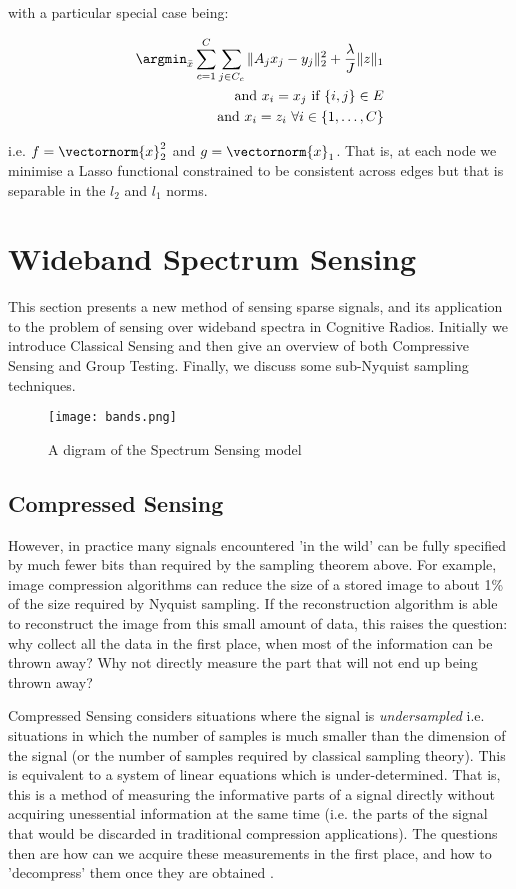 with a particular special case being:

\begin{align}
\argmin_{\bar{x}} \sum_{c=1}^C \sum_{j \in C_c} \|A_jx_j - y_j\|_2^2 + \frac{\lambda}{J}\|z\|_1 \nonumber \\ 
\text{ and } x_i = x_j \text{ if } \{i,j\} \in E \nonumber \\
\text{ and } x_i = z_i \text{ } \forall i \in \{1, \ldots, C\}
\label{constrainedbp}
\end{align}

i.e. \(f = \vectornorm{x}_2^2\) and \(g = \vectornorm{x}_1\). That is, at each node we minimise a Lasso functional constrained to be consistent across edges but that is separable in the \(l_2\) and \(l_1\) norms.

\section{Wideband Spectrum Sensing}
This section presents a new method of sensing sparse signals, and its application to the problem of sensing over wideband spectra in Cognitive Radios. Initially we introduce Classical Sensing and then give an overview of both Compressive Sensing and Group Testing. Finally, we discuss some sub-Nyquist sampling techniques.

\begin{figure*}[h]
\centering
\texttt{[image: bands.png]}
\caption{A digram of the Spectrum Sensing model \cite{Tian}}
\label{widebandspectra}
\end{figure*}



\subsection{Compressed Sensing}

However, in practice many signals encountered 'in the wild' can be fully specified by much fewer bits than required by the sampling theorem above. For example, image compression algorithms can reduce the size of a stored image to about 1\% of the size required by Nyquist sampling. If the reconstruction algorithm is able to reconstruct the image from this small amount of data, this raises the question: why collect all the data in the first place, when most of the information can be thrown away? Why not directly measure the part that will not end up being thrown away?

Compressed Sensing considers situations where the signal is \textit{undersampled} i.e. situations in which the number of samples is much smaller than the dimension of the signal (or the number of samples required by classical sampling theory). This is equivalent to a system of linear equations which is under-determined.  That is, this is a method of measuring the informative parts of a signal directly without acquiring unessential information at the same time (i.e. the parts of the signal that would be discarded in traditional compression applications). The questions then are how can we acquire these measurements in the first place, and how to 'decompress' them once they are obtained \cite{Donoho2006}. 

